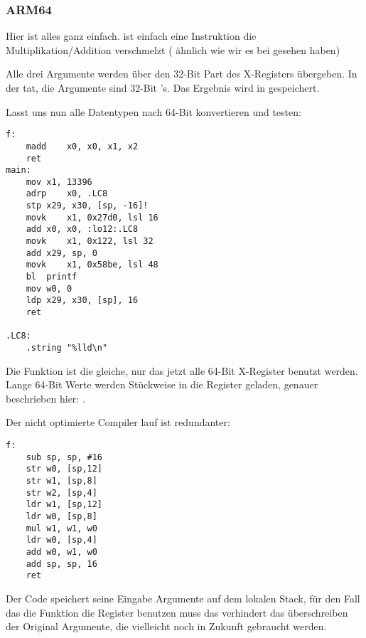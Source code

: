 \subsubsection{ARM64}



Hier ist alles ganz einfach. 
 ist einfach eine Instruktion die Multiplikation/Addition verschmelzt ( ähnlich wie wir es bei 
gesehen haben)

Alle drei Argumente werden über den 32-Bit Part des X-Registers übergeben.
In der tat, die Argumente sind 32-Bit 's.
Das Ergebnis wird in  gespeichert.



Lasst uns nun alle Datentypen nach 64-Bit  konvertieren und testen:



\begin{lstlisting}[style=customasmARM]
f:
	madd	x0, x0, x1, x2
	ret
main:
	mov	x1, 13396
	adrp	x0, .LC8
	stp	x29, x30, [sp, -16]!
	movk	x1, 0x27d0, lsl 16
	add	x0, x0, :lo12:.LC8
	movk	x1, 0x122, lsl 32
	add	x29, sp, 0
	movk	x1, 0x58be, lsl 48
	bl	printf
	mov	w0, 0
	ldp	x29, x30, [sp], 16
	ret

.LC8:
	.string	"%lld\n"
\end{lstlisting}

Die \ttf{} Funktion ist die gleiche, nur das jetzt alle 64-Bit X-Register benutzt werden.
Lange 64-Bit Werte werden Stückweise in die Register geladen, genauer beschrieben hier: .


Der nicht optimierte Compiler lauf ist redundanter:

\begin{lstlisting}[style=customasmARM]
f:
	sub	sp, sp, #16
	str	w0, [sp,12]
	str	w1, [sp,8]
	str	w2, [sp,4]
	ldr	w1, [sp,12]
	ldr	w0, [sp,8]
	mul	w1, w1, w0
	ldr	w0, [sp,4]
	add	w0, w1, w0
	add	sp, sp, 16
	ret
\end{lstlisting}

Der Code speichert seine Eingabe Argumente auf dem lokalen Stack,
für den Fall das die Funktion die  Register benutzen muss
das verhindert das überschreiben der Original Argumente, die vielleicht
noch in Zukunft gebraucht werden.

